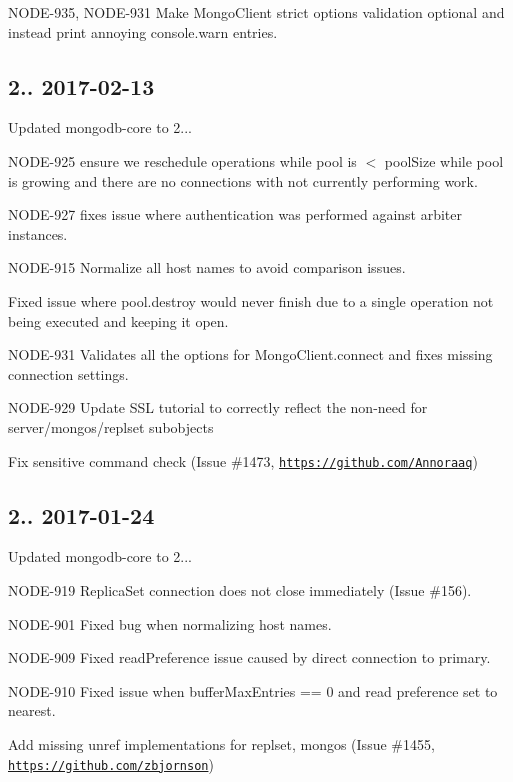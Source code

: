 \begin{DoxyItemize}
\item N\+O\+D\+E-\/935, N\+O\+D\+E-\/931 Make Mongo\+Client strict options validation optional and instead print annoying console.\+warn entries.
\end{DoxyItemize}

\subsection*{2.. 2017-\/02-\/13 }


\begin{DoxyItemize}
\item Updated mongodb-\/core to 2...
\begin{DoxyItemize}
\item N\+O\+D\+E-\/925 ensure we reschedule operations while pool is $<$ pool\+Size while pool is growing and there are no connections with not currently performing work.
\item N\+O\+D\+E-\/927 fixes issue where authentication was performed against arbiter instances.
\item N\+O\+D\+E-\/915 Normalize all host names to avoid comparison issues.
\item Fixed issue where pool.\+destroy would never finish due to a single operation not being executed and keeping it open.
\end{DoxyItemize}
\item N\+O\+D\+E-\/931 Validates all the options for Mongo\+Client.\+connect and fixes missing connection settings.
\item N\+O\+D\+E-\/929 Update S\+SL tutorial to correctly reflect the non-\/need for server/mongos/replset subobjects
\item Fix sensitive command check (Issue \#1473, \href{https://github.com/Annoraaq}{\tt https\+://github.\+com/\+Annoraaq})
\end{DoxyItemize}

\subsection*{2.. 2017-\/01-\/24 }


\begin{DoxyItemize}
\item Updated mongodb-\/core to 2...
\begin{DoxyItemize}
\item N\+O\+D\+E-\/919 Replica\+Set connection does not close immediately (Issue \#156).
\item N\+O\+D\+E-\/901 Fixed bug when normalizing host names.
\item N\+O\+D\+E-\/909 Fixed read\+Preference issue caused by direct connection to primary.
\item N\+O\+D\+E-\/910 Fixed issue when buffer\+Max\+Entries == 0 and read preference set to nearest.
\end{DoxyItemize}
\item Add missing unref implementations for replset, mongos (Issue \#1455, \href{https://github.com/zbjornson}{\tt https\+://github.\+com/zbjornson})
\end{DoxyItemize}

